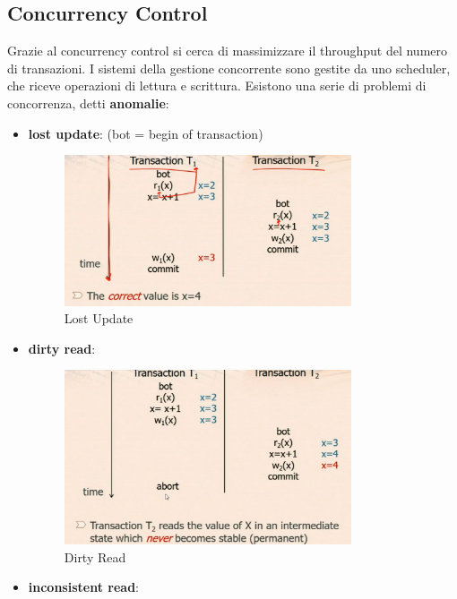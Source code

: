 \documentclass[12pt]{article}
\begin{document}
\subsection{Concurrency Control}
Grazie al concurrency control si cerca di massimizzare il throughput del numero di transazioni. I sistemi della gestione concorrente sono gestite da uno scheduler, che riceve operazioni di lettura e scrittura. Esistono una serie di problemi di concorrenza, detti \textbf{anomalie}:
\begin{itemize}
    \item \textbf{lost update}: (bot = begin of transaction)
        \begin{figure}[H]
            \centering
            \includegraphics[width=0.8\textwidth]{lost-update.png}
            \caption{Lost Update}
            \label{fig:lost-update}
        \end{figure}
    \item \textbf{dirty read}:
        \begin{figure}[H]
            \centering
            \includegraphics[width=0.8\textwidth]{dirty-read.png}
            \caption{Dirty Read}
            \label{fig:dirty-read}
        \end{figure}
    \item \textbf{inconsistent read}:
        \begin{figure}[H]

\end{figure}
\end{itemize}
\end{document}
